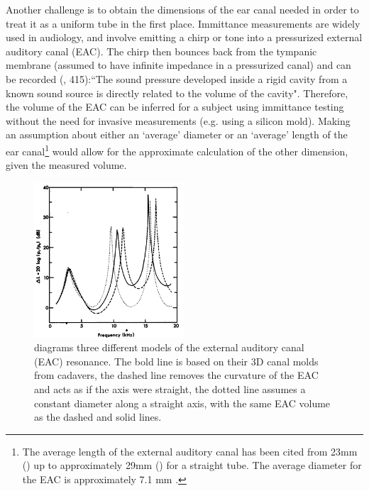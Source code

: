 \documentclass[dissertation,copyright]{uathesis}
\begin{document}
Another challenge is to obtain the dimensions of the ear canal needed in order to treat it as a uniform tube in the first place. Immittance measurements are widely used in audiology, and involve emitting a chirp or tone into a pressurized external auditory canal (EAC).  The chirp then bounces back from the tympanic membrane (assumed to have infinite impedance in a pressurized canal) and can be recorded (\cite{ballachanda:97}, 415):``The sound pressure developed inside a rigid cavity from a known sound source is directly related to the volume of the cavity".  Therefore, the volume of the EAC can be inferred for a subject using immittance testing without the need for invasive measurements (e.g. using a silicon mold).  Making an assumption about either an `average' diameter or an `average' length of the ear canal\footnote{The average length of the external auditory canal has been cited from 23mm (\cite{rosen:91}) up to approximately 29mm (\cite{stinson:89}) for a straight tube. The average diameter for the EAC is approximately 7.1 mm \cite{salvinelli:91}.}  would allow for the approximate calculation of the other dimension, given the measured volume. 

\begin{figure}
\centering
  \includegraphics[width=0.5\textwidth]{figure/eac_mod_diffs.png}
  \caption{\cite{stinson:89} diagrams three different models of the external auditory canal (EAC) resonance.  The bold line is based on their 3D canal molds from cadavers, the dashed line removes the curvature of the EAC and acts as if the axis were straight, the dotted line assumes a constant diameter along a straight axis, with the same EAC volume as the dashed and solid lines.}
  \label{fig:eac_modelling}
\end{figure}
\end{document}

